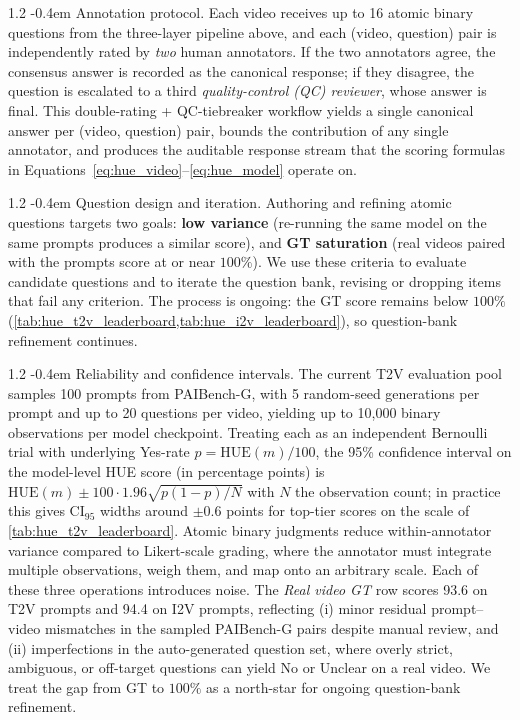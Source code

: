 \documentclass{llmxive}
\makeatletter
\providecommand{\paragraph}{  \@startsection{paragraph}{4}{\z@}    {1\baselineskip \@plus .2\baselineskip}    {-0.4em}    {\normalfont\normalsize\bfseries}}
\makeatother
\begin{document}
\paragraph{Annotation protocol.} Each video receives up to 16 atomic binary questions from the three-layer pipeline above, and each (video, question) pair is independently rated by \emph{two} human annotators. If the two annotators agree, the consensus answer is recorded as the canonical response; if they disagree, the question is escalated to a third \emph{quality-control (QC) reviewer}, whose answer is final. This double-rating + QC-tiebreaker workflow yields a single canonical answer per (video, question) pair, bounds the contribution of any single annotator, and produces the auditable response stream that the scoring formulas in Equations~\ref{eq:hue_video}--\ref{eq:hue_model} operate on.

\paragraph{Question design and iteration.} Authoring and refining atomic questions targets two goals: \textbf{low variance} (re-running the same model on the same prompts produces a similar score), and \textbf{GT saturation} (real videos paired with the prompts score at or near $100\%$). We use these criteria to evaluate candidate questions and to iterate the question bank, revising or dropping items that fail any criterion. The process is ongoing: the GT score remains below $100\%$ (\cref{tab:hue_t2v_leaderboard,tab:hue_i2v_leaderboard}), so question-bank refinement continues.

\paragraph{Reliability and confidence intervals.} The current T2V evaluation pool samples 100 prompts from PAIBench-G, with 5 random-seed generations per prompt and up to 20 questions
per video, yielding up to 10{,}000 binary observations per model checkpoint. Treating each as an independent Bernoulli trial with underlying Yes-rate $p = \mathrm{HUE}(m)/100$, the
95\% confidence interval on the model-level HUE score (in percentage points) is $\mathrm{HUE}(m) \pm 100 \cdot 1.96\sqrt{p(1-p)/N}$ with $N$ the observation count; in practice this
gives CI$_{95}$ widths around $\pm 0.6$ points for top-tier scores on the scale of \cref{tab:hue_t2v_leaderboard}. Atomic binary judgments reduce within-annotator variance compared to
Likert-scale grading, where the annotator must integrate multiple observations, weigh them, and map onto an arbitrary scale. Each of these three operations introduces noise. The
\emph{Real video GT} row scores 93.6 on T2V prompts and 94.4 on I2V prompts, reflecting (i) minor residual prompt--video mismatches in the sampled PAIBench-G pairs despite manual
review, and (ii) imperfections in the auto-generated question set, where overly strict, ambiguous, or off-target questions can yield No or Unclear on a real video. We treat the gap
from GT to $100\%$ as a north-star for ongoing question-bank refinement.
\end{document}
